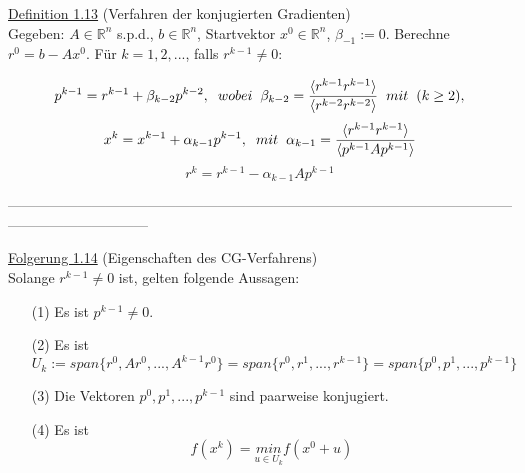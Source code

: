 \documentclass[a4paper]{letter}
\begin{document}
\underline{Definition 1.13} (Verfahren der konjugierten Gradienten)
\\Gegeben: $A \in \mathbb{R}^{n}$ s.p.d., $b \in \mathbb{R}^{n}$, Startvektor $x^{0} \in \mathbb{R}^{n}$, $\beta_{-1} := 0$. Berechne $r^{0} = b - Ax^{0}$. F\"ur $k = 1,2,...$, falls $r^{k-1} \ne 0$:
\begin{Large}
\emph{
	$$p^{k-1} = r^{k-1} + \beta_{k-2}p^{k-2}, \hspace{2mm} wobei \hspace{2mm} \beta_{k-2} = \frac {\langle r^{k-1} r^{k-1} \rangle} {\langle r^{k-2} r^{k-2} \rangle} \hspace{2mm} mit \hspace{2mm} (k \ge 2),$$
	$$x^{k} = x^{k-1} + \alpha_{k-1}p^{k-1}, \hspace{2mm} mit \hspace{2mm} \alpha_{k-1} = \frac {\langle r^{k-1} r^{k-1} \rangle} {\langle p^{k-1} Ap^{k-1} \rangle}$$
	$$r^{k} = r^{k-1} - \alpha_{k-1}Ap^{k-1}$$
}
\end{Large}

------------------------------------------------------------------------------------------------------------------------------------------



\underline{Folgerung 1.14} (Eigenschaften des CG-Verfahrens)
\\Solange $r^{k-1} \ne 0$ ist, gelten folgende Aussagen:
\begin{itemize}
\item[(1)] Es ist $p^{k-1} \ne 0$.
\item[(2)] Es ist
$$U_{k} := span\{r^{0}, Ar^{0},...,A^{k-1}r^{0}\} = span\{r^{0}, r^{1},...,r^{k-1}\} = span\{p^{0},p^{1},...,p^{k-1}\}$$
\item[(3)] Die Vektoren $p^{0},p^{1},...,p^{k-1}$ sind paarweise konjugiert.
\item[(4)] Es ist
$$f(x^{k}) = \underset{u \in U_{k}}{min} f(x^{0} + u)$$
\end{itemize}
\end{document}

